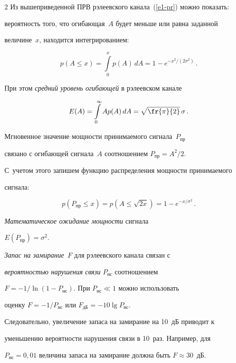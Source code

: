 \begin{multicols}{2}
     Из вышеприведенной ПРВ рэлеевского канала~(\ref{e1-pr}) можно показать: 


вероятность того, что огибающая~$A$ будет меньше или равна заданной 


величине~$x$, находится интегрированием:


     $$


     p(A\leq x)=\int\limits_0^x p(A)\,dA=1-e^{-x^2/(2\sigma^2)}\,.


     $$


При этом \textit{средний уровень огибающей} в рэлеевском канале


$$


E(A)=\int\limits_0^\infty Ap(A)\,dA=\sqrt{\fr{\pi}{2}}\,\sigma\,.


$$


Мгновенное значение мощности принимаемого сигнала~$P_{\mathrm{пр}}$ 


связано с огибающей сигнала~$A$ соотношением $P_{\mathrm{пр}}=A^2/2$. 


С~учетом этого запишем функцию распределения мощности принимаемого 


сигнала:


$$


p(P_{\mathrm{пр}}\leq x)=p\left(A\leq\sqrt{2x}\right)=1-e^{-x/\sigma^2}\,.


$$


\textit{Математическое ожидание мощности} сигнала 


$E(P_{\mathrm{пр}})=\sigma^2$.


     


     \textit{Запас на замирание}~$F$ для рэлеевского канала связан с 


\textit{вероятностью нарушения связи} $P_{\mathrm{нс}}$ соотношением 


$F=-1/\ln(1-P_{\mathrm{нс}})$. При $P_{\mathrm{нс}}\ll 1$ можно использовать 


оценку $F=-1/P_{\mathrm{нс}}$ или $F_{\mathrm{дБ}}=-10\lg P_{\mathrm{нс}}$. 


Следовательно, увеличение запаса на замирание на 10~дБ приводит к 


уменьшению вероятности нарушения связи в 10~раз. Например, для 


$P_{\mathrm{нс}}=0{,}01$ величина запаса на замирание должна быть $F\approx 


30$~дБ.






\end{multicols}
